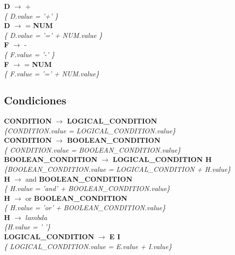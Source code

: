\documentclass[10pt,a4paper]{article}
\begin{document}
\textbf{D} $\rightarrow$ +   \\
\textit{\{ D.value = '+'  \}} \\

\textbf{D} $\rightarrow$ = \textbf{NUM} \\
\textit{\{ D.value =  '=' + NUM.value  \}} \\

\textbf{F} $\rightarrow$ - \\
\textit{\{ F.value = '-'  \}} \\

\textbf{F} $\rightarrow$ = \textbf{NUM} \\
\textit{\{ F.value =  '=' + NUM.value\}} \\

\subsection{Condiciones}
\textbf{CONDITION} $\rightarrow$ \textbf{LOGICAL\_CONDITION}   \\
\textit{\{CONDITION.value = LOGICAL\_CONDITION.value\}}\\

\textbf{CONDITION} $\rightarrow$ \textbf{BOOLEAN\_CONDITION} \\
\textit{\{ CONDITION.value = BOOLEAN\_CONDITION.value\}} \\

\textbf{BOOLEAN\_CONDITION} $\rightarrow$ \textbf{LOGICAL\_CONDITION H} \\
\textit{\{BOOLEAN\_CONDITION.value = LOGICAL\_CONDITION + H.value\}} \\

\textbf{H} $\rightarrow$ and \textbf{BOOLEAN\_CONDITION} \\
\textit{\{ H.value = 'and' + BOOLEAN\_CONDITION.value\}} \\

\textbf{H} $\rightarrow$ or \textbf{BOOLEAN\_CONDITION} \\
\textit{\{ H.value = 'or' + BOOLEAN\_CONDITION.value\}} \\

\textbf{H} $\rightarrow$ $lambda$ \\
\textit{\{H.value = ' '\}} \\

\textbf{LOGICAL\_CONDITION} $\rightarrow$ \textbf{E I} \\
\textit{\{ LOGICAL\_CONDITION.value = E.value + I.value\}} \\
\end{document}
